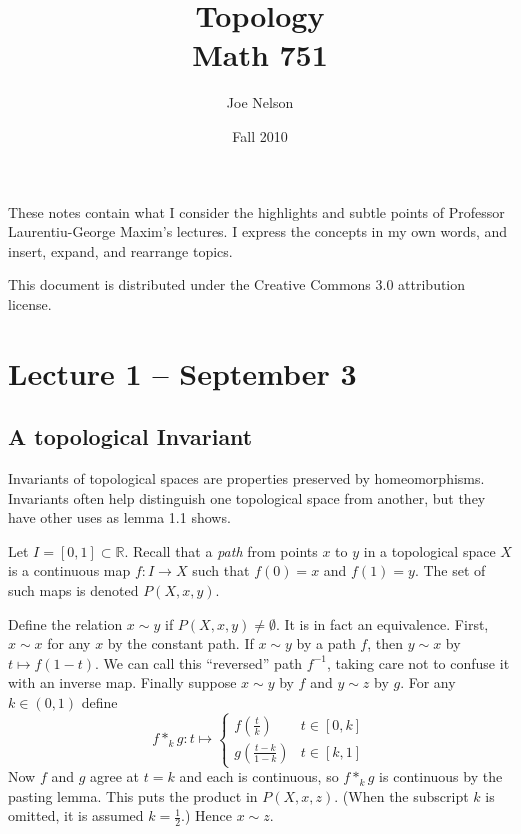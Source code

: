 \documentclass[letterpaper]{article}
\begin{document}
\title{Topology\\
Math 751}
\author{Joe Nelson}
\date{Fall 2010}
\maketitle

These notes contain what I consider the highlights and subtle points of Professor Laurentiu-George Maxim's lectures. I express the concepts in my own words, and insert, expand, and rearrange topics.

This document is distributed under the Creative Commons 3.0 attribution license.

\section{Lecture 1 -- September 3}

\subsection{A topological Invariant}

Invariants of topological spaces are properties preserved by homeomorphisms. Invariants often help distinguish one topological space from another, but they have other uses as lemma 1.1 shows.

Let $I = [0, 1] \subset \mathbb{R}$. Recall that a \emph{path} from points $x$ to $y$ in a topological space $X$ is a continuous map $f \colon I \rightarrow X$ such that $f(0) = x$ and $f(1) = y$. The set of such maps is denoted $P(X, x, y)$.

Define the relation $x \sim y$ if $P(X, x, y) \ne \emptyset$. It is in fact an equivalence. First, $x \sim x$ for any $x$ by the constant path. If $x \sim y$ by a path $f$, then $y \sim x$ by $t \mapsto f(1-t)$. We can call this ``reversed'' path $f^{-1}$, taking care not to confuse it with an inverse map. Finally suppose $x \sim y$ by $f$ and $y \sim z$ by $g$. For any $k \in (0, 1)$ define
\[ f \ast_k g \colon t \mapsto
   \left\{
     \begin{array}{lr}
       f(\frac{t}{k}) & t \in [0, k]\\
       g(\frac{t-k}{1-k}) & t \in [k, 1]
     \end{array}
   \right.
\]
Now $f$ and $g$ agree at $t = k$ and each is continuous, so $f \ast_k g$ is continuous by the pasting lemma. This puts the product in $P(X, x, z)$. (When the subscript $k$ is omitted, it is assumed $k = \frac{1}{2}$.) Hence $x \sim z$.
\end{document}
